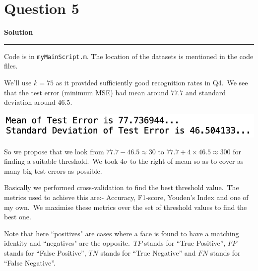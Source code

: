 \documentclass[a4paper,12pt]{article}
\title{\cooltitle{CS663 Assignment-4}}
\author{{\bf Saksham Rathi, Kavya Gupta, Shravan Srinivasa Raghavan} \\
\small Department of Computer Science, \\
Indian Institute of Technology Bombay \\}
\date{}
\newenvironment{solution}[2][]{%
    \begin{mdframed}[linecolor=blue!70!black, linewidth=2pt, roundcorner=10pt, backgroundcolor=yellow!10!white, skipabove=12pt, skipbelow=12pt]%
        \textbf{\large #2}
        \par\noindent\rule{\textwidth}{0.4pt}
}{
    \end{mdframed}
}
\begin{document}
\maketitle

\section*{Question 5}

\begin{solution}{Solution}
	Code is in \texttt{myMainScript.m}. The location of the datasets is mentioned in the code files.

	We'll use $k = 75$ as it provided sufficiently good recognition rates in Q4.\ We see that the test error (minimum MSE) had mean around $77.7$ and standard deviation around $46.5$.

	\begin{center}
		\includegraphics[scale=0.5]{../images/mean_std-dev.png}
	\end{center}

	So we propose that we look from $77.7 - 46.5 \approx 30$ to $77.7 + 4 \times 46.5 \approx 300$ for finding a suitable threshold.\ We took $4 \sigma$ to the right of mean so as to cover as many big test errors as possible.

	Basically we performed cross-validation to find the best threshold value.\ The metrics used to achieve this are:- Accuracy, F1-score, Youden's Index and one of my own.\ We maximise these metrics over the set of threshold values to find the best one.

	Note that here ``positives" are cases where a face is found to have a matching identity and ``negatives" are the opposite.\ $TP$ stands for ``True Positive'', $FP$ stands for ``False Positive'', $TN$ stands for ``True Negative'' and $FN$ stands for ``False Negative''.


\end{solution}
\end{document}
